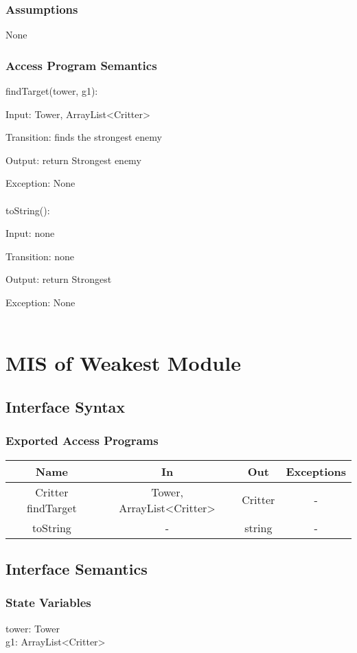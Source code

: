 \documentclass[12,english]{article}
\begin{document}
		\subsubsection{Assumptions}
        None

		\subsubsection{Access Program Semantics}
		findTarget(tower, g1):
		
		Input: Tower, ArrayList<Critter>
		
		Transition: finds the strongest enemy
		
		Output: return Strongest enemy
		
		Exception: None\\
		\\
		toString():
		
		Input: none
		
		Transition: none
		
		Output: return Strongest
		
		Exception: None\\
		\\
\section{MIS of Weakest Module}
	\subsection{Interface Syntax}
		\subsubsection{Exported Access Programs}
		
	\begin{tabular}[pos]{|c|c|c|c|}
	\hline
	\textbf{Name}& \textbf{In} & \textbf{Out} & \textbf{Exceptions} \\ 
	\hline
	Critter findTarget & Tower, ArrayList<Critter> & Critter & - \\ \hline
	toString & - & string & - \\ \hline
					
	\end{tabular}		
		
	\subsection{Interface Semantics}
		\subsubsection{State Variables}
		tower: Tower\\
	    g1: ArrayList<Critter>\\
\end{document}
